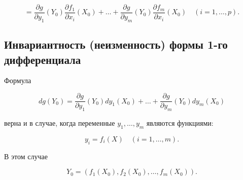 {\[
= \frac{\partial g}{\partial y_1}(Y_0) \frac{\partial f_1}{\partial x_i}(X_0) + \ldots + \frac{\partial g}{\partial y_m}(Y_0) \frac{\partial f_m}{\partial x_i}(X_0) \quad (i = 1, \ldots, p).
\]



\subsection*{Инвариантность (неизменность) формы 1-го дифференциала}

Формула



\[
dg(Y_0) = \frac{\partial g}{\partial y_1}(Y_0) dy_1(X_0) + \ldots + \frac{\partial g}{\partial y_m}(Y_0) dy_m(X_0)
\]



верна и в случае, когда переменные \( y_1, \ldots, y_m \) являются функциями:



\[
y_i = f_i(X) \quad (i = 1, \ldots, m).
\]



В этом случае



\[
Y_0 = (f_1(X_0), f_2(X_0), \ldots, f_m(X_0)).
\]




}